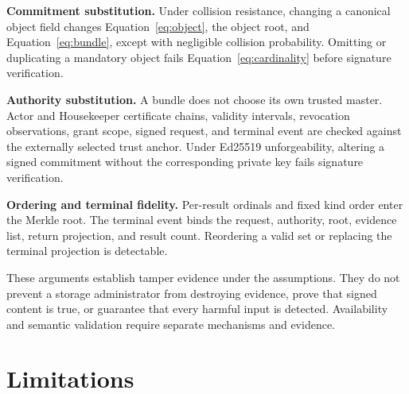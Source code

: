 \documentclass[10pt]{article}
\begin{document}
\textbf{Commitment substitution.} Under collision resistance, changing a
canonical object field changes Equation~\ref{eq:object}, the object root, and
Equation~\ref{eq:bundle}, except with negligible collision probability.
Omitting or duplicating a mandatory object fails Equation~\ref{eq:cardinality}
before signature verification.

\textbf{Authority substitution.} A bundle does not choose its own trusted
master. Actor and Housekeeper certificate chains, validity intervals,
revocation observations, grant scope, signed request, and terminal event are
checked against the externally selected trust anchor. Under Ed25519
unforgeability, altering a signed commitment without the corresponding private
key fails signature verification.

\textbf{Ordering and terminal fidelity.} Per-result ordinals and fixed kind
order enter the Merkle root. The terminal event binds the request, authority,
root, evidence list, return projection, and result count. Reordering a valid set
or replacing the terminal projection is detectable.

These arguments establish tamper evidence under the assumptions. They do not
prevent a storage administrator from destroying evidence, prove that signed
content is true, or guarantee that every harmful input is detected. Availability
and semantic validation require separate mechanisms and evidence.

\section{Limitations}
\end{document}

